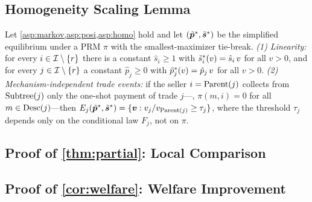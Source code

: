 \subsection{Homogeneity Scaling Lemma}
\begin{lemma}
\label{lem:scaling}
Let \cref{asp:markov,asp:posi,asp:homo} hold and let $(\tilde{{\bm{p}}}^*, \tilde{{\bm{s}}}^*)$ be the simplified equilibrium under a PRM $\pi$ with the smallest-maximizer tie-break.
\emph{(1) Linearity:} for every $i \in \mathcal{I} \setminus \{r\}$ there is a constant $\hat{s}_i \ge 1$ with $\tilde{s}^*_i(v) = \hat{s}_i\, v$ for all $v > 0$, and for every $j \in \mathcal{I} \setminus \{r\}$ a constant $\hat{p}_j \ge 0$ with $\tilde{p}^*_j(v) = \hat{p}_j\, v$ for all $v > 0$.
\emph{(2) Mechanism-independent trade events:} if the seller $i = \operatorname{Parent}(j)$ collects from $\operatorname{Subtree}(j)$ only the one-shot payment of trade $j$---\ie, $\pi(m,i) = 0$ for all $m \in \operatorname{Desc}(j)$---then $E_j(\tilde{{\bm{p}}}^*, \tilde{{\bm{s}}}^*) = \{{\bm{v}} : v_j / v_{\operatorname{Parent}(j)} \ge \tau_j\}$, where the threshold $\tau_j$ depends only on the conditional law $F_j$, not on $\pi$.
\end{lemma}



\subsection{Proof of \texorpdfstring{\cref{thm:partial}}{Theorem~\ref{thm:partial}}: Local Comparison}
\thmPartial*



\subsection{Proof of \texorpdfstring{\cref{cor:welfare}}{Corollary~\ref{cor:welfare}}: Welfare Improvement}

